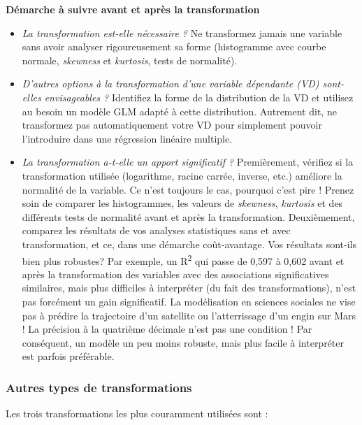 \documentclass[
  11pt,
  french,
]{book}
\makeatletter
\newenvironment{kframev}{%
\medskip{}
\setlength{\fboxsep}{.8em}
 \def\at@end@of@kframev{}%
 \ifinner\ifhmode%
  \def\at@end@of@kframev{\end{minipage}}%
  \begin{minipage}{\columnwidth}%
 \fi\fi%
 \def\FrameCommand##1{\hskip\@totalleftmargin \hskip-\fboxsep
 \colorbox{shadebluecolor}{##1}\hskip-\fboxsep
     \hskip-\linewidth \hskip-\@totalleftmargin \hskip\columnwidth}%
 \MakeFramed {\advance\hsize-\width
   \@totalleftmargin\z@ \linewidth\hsize
   \@setminipage}}%
 {\par\unskip\endMakeFramed%
 \at@end@of@kframev}
\newenvironment{rmdblock}[1]
  {
  \begin{itemize}
  \renewcommand{\labelitemi}{
    \raisebox{-.7\height}[0pt][0pt]{
      {\setkeys{Gin}{width=3em,keepaspectratio}\texttt{[image: images/\#1]}}
    }
  }
  \setlength{\fboxsep}{1em}
  \begin{kframev}
  \small
  \item
  }
  {
  \end{kframev}
  \end{itemize}
  }
\newenvironment{bloc_attention}
  {\begin{rmdblock}{attention}}
  {\end{rmdblock}}
\makeatother
\begin{document}
\begin{bloc_attention}
\textbf{Démarche à suivre avant et après la transformation}

\begin{itemize}
\item
  \emph{La transformation est-elle nécessaire ?} Ne transformez jamais une variable sans avoir analyser rigoureusement sa forme (histogramme avec courbe normale, \emph{skewness} et \emph{kurtosis}, tests de normalité).
\item
  \emph{D'autres options à la transformation d'une variable dépendante (VD) sont-elles envisageables ?} Identifiez la forme de la distribution de la VD et utilisez au besoin un modèle GLM adapté à cette distribution. Autrement dit, ne transformez pas automatiquement votre VD pour simplement pouvoir l'introduire dans une régression linéaire multiple.
\item
  \emph{La transformation a-t-elle un apport significatif ?} Premièrement, vérifiez si la transformation utilisée (logarithme, racine carrée, inverse, etc.) améliore la normalité de la variable. Ce n'est toujours le cas, pourquoi c'est pire ! Prenez soin de comparer les histogrammes, les valeurs de \emph{skewness}, \emph{kurtosis} et des différents tests de normalité avant et après la transformation. Deuxièmement, comparez les résultats de vos analyses statistiques sans et avec transformation, et ce, dans une démarche coût-avantage. Vos résultats sont-ils bien plus robustes? Par exemple, un R\textsuperscript{2} qui passe de 0,597 à 0,602 avant et après la transformation des variables avec des associations significatives similaires, mais plus difficiles à interpréter (du fait des transformations), n'est pas forcément un gain significatif. La modélisation en sciences sociales ne vise pas à prédire la trajectoire d'un satellite ou l'atterrissage d'un engin sur Mars ! La précision à la quatrième décimale n'est pas une condition ! Par conséquent, un modèle un peu moins robuste, mais plus facile à interpréter est parfois préférable.
\end{itemize}


\end{bloc_attention}

\hypertarget{sect02552}{%
\subsubsection{Autres types de transformations}\label{sect02552}}

Les trois transformations les plus couramment utilisées sont :
\end{document}
